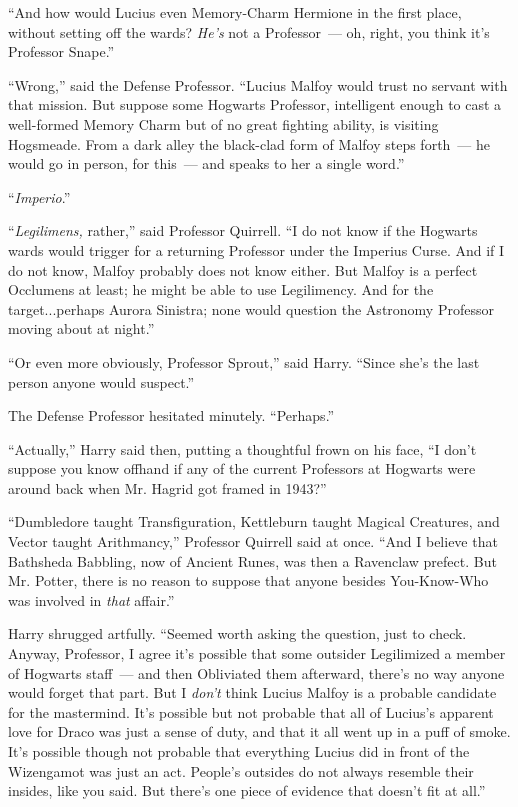 ``And how would Lucius even Memory-Charm Hermione in the first place, without setting off the wards? \emph{He's} not a Professor~--- oh, right, you think it's Professor Snape.''

``Wrong,'' said the Defense Professor. ``Lucius Malfoy would trust no servant with that mission. But suppose some Hogwarts Professor, intelligent enough to cast a well-formed Memory Charm but of no great fighting ability, is visiting Hogsmeade. From a dark alley the black-clad form of Malfoy steps forth~--- he would go in person, for this~--- and speaks to her a single word.''

``\emph{Imperio}.''

``\emph{Legilimens,} rather,'' said Professor Quirrell. ``I do not know if the Hogwarts wards would trigger for a returning Professor under the Imperius Curse. And if I do not know, Malfoy probably does not know either. But Malfoy is a perfect Occlumens at least; he might be able to use Legilimency. And for the target...perhaps Aurora Sinistra; none would question the Astronomy Professor moving about at night.''

``Or even more obviously, Professor Sprout,'' said Harry. ``Since she's the last person anyone would suspect.''

The Defense Professor hesitated minutely. ``Perhaps.''

``Actually,'' Harry said then, putting a thoughtful frown on his face, ``I don't suppose you know offhand if any of the current Professors at Hogwarts were around back when Mr. Hagrid got framed in 1943?''

``Dumbledore taught Transfiguration, Kettleburn taught Magical Creatures, and Vector taught Arithmancy,'' Professor Quirrell said at once. ``And I believe that Bathsheda Babbling, now of Ancient Runes, was then a Ravenclaw prefect. But Mr. Potter, there is no reason to suppose that anyone besides You-Know-Who was involved in \emph{that} affair.''

Harry shrugged artfully. ``Seemed worth asking the question, just to check. Anyway, Professor, I agree it's possible that some outsider Legilimized a member of Hogwarts staff~--- and then Obliviated them afterward, there's no way anyone would forget that part. But I \emph{don't} think Lucius Malfoy is a probable candidate for the mastermind. It's possible but not probable that all of Lucius's apparent love for Draco was just a sense of duty, and that it all went up in a puff of smoke. It's possible though not probable that everything Lucius did in front of the Wizengamot was just an act. People's outsides do not always resemble their insides, like you said. But there's one piece of evidence that doesn't fit at all.''

